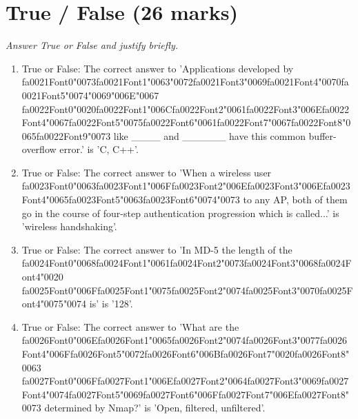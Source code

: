\documentclass[12pt]{article}
\begin{document}
\section*{True / False (26 marks)}
\textit{Answer True or False and justify briefly.}
\begin{enumerate}[label=\arabic*.]
\item True or False: The correct answer to 'Applications developed by {\csname fa0021Font0\endcsname\char"0073}{\csname fa0021Font1\endcsname\char"0063}{\char"0072}{\csname fa0021Font3\endcsname\char"0069}{\csname fa0021Font4\endcsname\char"0070}{\csname fa0021Font5\endcsname\char"0074}{\char"0069}{\char"006E}{\char"0067} {\csname fa0022Font0\endcsname\char"0020}{\csname fa0022Font1\endcsname\char"006C}{\csname fa0022Font2\endcsname\char"0061}{\csname fa0022Font3\endcsname\char"006E}{\csname fa0022Font4\endcsname\char"0067}{\csname fa0022Font5\endcsname\char"0075}{\csname fa0022Font6\endcsname\char"0061}{\csname fa0022Font7\endcsname\char"0067}{\csname fa0022Font8\endcsname\char"0065}{\csname fa0022Font9\endcsname\char"0073} like \_\_\_\_ and \_\_\_\_\_\_ have this common buffer-overflow error.' is 'C, C++'.
\item True or False: The correct answer to 'When a wireless user {\csname fa0023Font0\endcsname\char"0063}{\csname fa0023Font1\endcsname\char"006F}{\csname fa0023Font2\endcsname\char"006E}{\csname fa0023Font3\endcsname\char"006E}{\csname fa0023Font4\endcsname\char"0065}{\csname fa0023Font5\endcsname\char"0063}{\csname fa0023Font6\endcsname\char"0074}{\char"0073} to any AP, both of them go in the course of four-step authentication progression which is called...' is 'wireless handshaking'.
\item True or False: The correct answer to 'In MD-5 the length of the {\csname fa0024Font0\endcsname\char"0068}{\csname fa0024Font1\endcsname\char"0061}{\csname fa0024Font2\endcsname\char"0073}{\csname fa0024Font3\endcsname\char"0068}{\csname fa0024Font4\endcsname\char"0020} {\csname fa0025Font0\endcsname\char"006F}{\csname fa0025Font1\endcsname\char"0075}{\csname fa0025Font2\endcsname\char"0074}{\csname fa0025Font3\endcsname\char"0070}{\csname fa0025Font4\endcsname\char"0075}{\char"0074} is' is '128'.
\item True or False: The correct answer to 'What are the {\csname fa0026Font0\endcsname\char"006E}{\csname fa0026Font1\endcsname\char"0065}{\csname fa0026Font2\endcsname\char"0074}{\csname fa0026Font3\endcsname\char"0077}{\csname fa0026Font4\endcsname\char"006F}{\csname fa0026Font5\endcsname\char"0072}{\csname fa0026Font6\endcsname\char"006B}{\csname fa0026Font7\endcsname\char"0020}{\csname fa0026Font8\endcsname\char"0063} {\csname fa0027Font0\endcsname\char"006F}{\csname fa0027Font1\endcsname\char"006E}{\csname fa0027Font2\endcsname\char"0064}{\csname fa0027Font3\endcsname\char"0069}{\csname fa0027Font4\endcsname\char"0074}{\csname fa0027Font5\endcsname\char"0069}{\csname fa0027Font6\endcsname\char"006F}{\csname fa0027Font7\endcsname\char"006E}{\csname fa0027Font8\endcsname\char"0073} determined by Nmap?' is 'Open, filtered, unfiltered'.

\end{enumerate}
\end{document}
